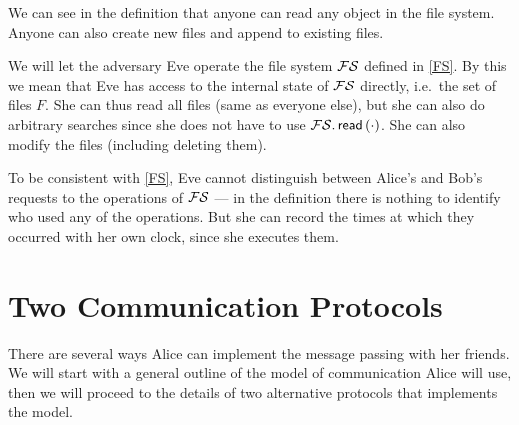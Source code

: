 We can see in the definition that anyone can read any object in the file 
system.
Anyone can also create new files and append to existing files.

%

We will let the adversary Eve operate the file system \(\operatorname{\mathcal{FS}}\) defined in 
\cref{FS}.
By this we mean that Eve has access to the internal state of \(\operatorname{\mathcal{FS}}\) directly, 
i.e.\ the set of files \(F\).
She can thus read all files (same as everyone else), but she can also do 
arbitrary searches since she does not have to use \(\operatorname{\operatorname{\mathcal{FS}}.\mathsf{read}}\left( \cdot \right)\).
She can also modify the files (including deleting them).

To be consistent with \cref{FS}, Eve cannot distinguish between Alice's and 
Bob's requests to the operations of \(\operatorname{\mathcal{FS}}\) --- in the definition there is 
nothing to identify who used any of the operations.
But she can record the times at which they occurred with her own clock, since 
she executes them.



\section{Two Communication Protocols}\label{PushAndPull}

There are several ways Alice can implement the message passing with her 
friends.
We will start with a general outline of the model of communication Alice will 
use, then we will proceed to the details of two alternative protocols that 
implements the model.

